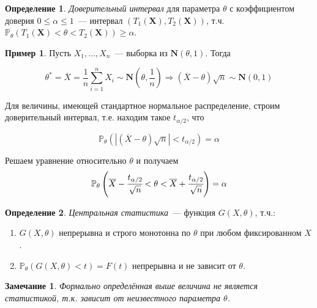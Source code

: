 \documentclass[oneside,final,14pt]{extreport}
\newtheorem*{rmrk}{Замечание}
\theoremstyle{definition}
\newtheorem{defn}{Определение}[section]
\newtheorem*{exmp}{Пример}
\begin{document}
\begin{defn}
{\it Доверительный интервал} для параметра $\theta$ с коэффициентом доверия $0 \leqslant \alpha \leqslant 1$~--- интервал $(T_1(\mathbf{X}), T_2(\mathbf{X}))$, т.ч. $\mathbb{P}_{\theta}(T_1(\mathbf{X}) < \theta < T_2(\mathbf{X})) \geq \alpha$.
\end{defn}

\begin{exmp}
Пусть $X_1, \ldots, X_n$~--- выборка из $\mathbf{N}(\theta, 1)$. Тогда

\begin{equation*}
    \theta^{*}
    = \overline{X}
    = \frac{1}{n} \sum_{i=1}^{n} X_{i} \sim \mathbf{N}\left(\theta, \frac{1}{n}\right)
    \Rightarrow (\overline{X}-\theta) \sqrt{n} \sim \mathbf{N}(0,1)
\end{equation*}

Для величины, имеющей стандартное нормальное распределение, строим доверительный интервал, т.е. находим такое $t_{\alpha / 2}$, что 

\begin{equation*}
    \mathbb{P}_{\theta}\left(|(\overline{X}-\theta) \sqrt{n}|<t_{\alpha / 2}\right)=\alpha
\end{equation*}

Решаем уравнение относительно $\theta$ и получаем
\begin{equation*}
    \mathbb{P}_{\theta}\left(\overline{X}-\cfrac{t_{\alpha / 2}}{\sqrt{n}}<\theta<\overline{X}+\cfrac{t_{\alpha / 2}}{\sqrt{n}}\right)=\alpha 
\end{equation*}

\end{exmp}

\begin{defn}
{\it Центральная статистика}~--- функция $G(X,\theta)$, т.ч.:
\begin{enumerate}
    \item $G(X,\theta)$ непрерывна и строго монотонна по $\theta$ при любом фиксированном $X$.
    \item $\mathbb{P}_{\theta}(G(X, \theta)<t)=F(t)$ непрерывна и не зависит от $\theta$.
\end{enumerate}
\end{defn}

\begin{rmrk}
Формально определённая выше величина не является статистикой, т.к. зависит от неизвестного параметра $\theta$.
\end{rmrk}
\end{document}
